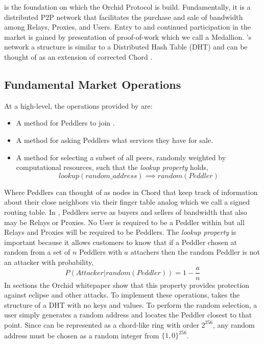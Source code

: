 
\TOM{} is the foundation on which the Orchid Protocol is build. Fundamentally, it is a distributed P2P network that facilitates the purchase and sale of bandwidth among Relays, Proxies, and Users. Entry to and continued participation in the market is gained by presentation of proof-of-work which we call a Medallion. \TOM{}'s network a structure is similar to a Distributed Hash Table (DHT) and can be thought of as an extension of corrected Chord \cite{ChordCorrect,CHORD}.

\subsection{Fundamental Market Operations}
\label{fund-market}


At a high-level, the operations provided by \tOM{} are:

\begin{itemize}
\item A method for Peddlers to join \tOM{}.
\item A method for asking Peddlers what services they have for sale.
\item A method for selecting a subset of all peers, randomly weighted by computational resources, such that the \emph{lookup property} holds,
						$$lookup(random\_address) \implies random(Peddler)$$
\end{itemize}

Where Peddlers can thought of as nodes in Chord that keep track of information about their close neighbors via their finger table analog which we call a signed routing table. In \TOM{}, Peddlers serve as buyers and sellers of bandwidth that also may be Relays or Proxies. No User is required to be a Peddler within \TOM{} but all Relays and Proxies will be required to be Peddlers. The \emph{lookup property} is important because it allows customers to know that if a Peddler chosen at random from a set of $n$ Peddlers with $a$ attachers then the random Peddler is not an attacker with probability,
						$$P(Attacker|random(Peddler)) = 1-\frac{a}{n}$$
In sections the Orchid whitepaper \cite{orchid} show that this property provides protection against eclipse and other attacks. To implement these 
operations, \tOM{} takes the structure of a DHT with no keys and values. To perform the random selection, a user simply generates a random address and locates the Peddler closest to that point. Since \TOM{} can be represented as a chord-like ring with order $2^{256}$, any random address must be chosen as a random integer from $\{1,0\}^{256}$.

